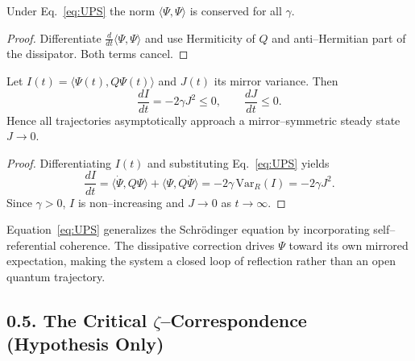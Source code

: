 \begin{lemma}
Under Eq.~\eqref{eq:UPS} the norm $\langle\Psi,\Psi\rangle$ is conserved for all $\gamma$.
\end{lemma}

\begin{proof}
Differentiate $\frac{d}{dt}\langle\Psi,\Psi\rangle$ and use Hermiticity of $Q$ and anti–Hermitian part of the dissipator.
Both terms cancel.
\end{proof}

\begin{theorem}
Let $I(t)=\langle\Psi(t),Q\Psi(t)\rangle$ and $J(t)$ its mirror variance.
Then
\[
\frac{dI}{dt} = -2\gamma J^2 \le 0, \qquad
\frac{dJ}{dt} \le 0.
\]
Hence all trajectories asymptotically approach a mirror–symmetric steady state $J\to0$.
\end{theorem}

\begin{proof}
Differentiating $I(t)$ and substituting Eq.~\eqref{eq:UPS} yields
\[
\frac{dI}{dt}
 = \langle \dot\Psi, Q\Psi\rangle + \langle \Psi, Q\dot\Psi\rangle
 = -2\gamma\,\mathrm{Var}_R(I)
 = -2\gamma J^2.
\]
Since $\gamma>0$, $I$ is non–increasing and $J\to0$ as $t\to\infty$.
\end{proof}

\begin{remark}
Equation~\eqref{eq:UPS} generalizes the Schrödinger equation by incorporating self–referential coherence.
The dissipative correction drives $\Psi$ toward its own mirrored expectation,
making the system a closed loop of reflection rather than an open quantum trajectory.
\end{remark}


\subsection*{0.5. The Critical $\zeta$–Correspondence (Hypothesis Only)}

